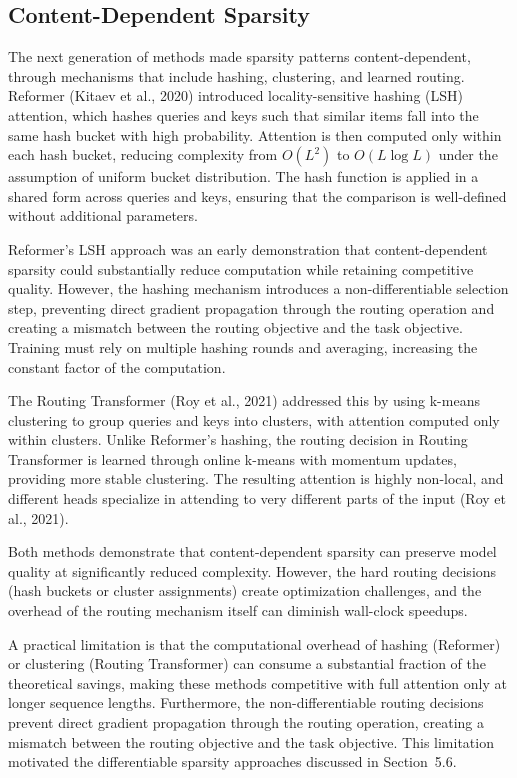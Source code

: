\documentclass[10pt,twocolumn]{article}
\begin{document}
\subsection{Content-Dependent Sparsity}\label{learnable-sparsity}

The next generation of methods made sparsity patterns content-dependent, through mechanisms that include hashing, clustering, and learned routing. Reformer (Kitaev et al., 2020) introduced locality-sensitive hashing (LSH) attention, which hashes queries and keys such that similar items fall into the same hash bucket with high probability. Attention is then computed only within each hash bucket, reducing complexity from $O(L^2)$ to $O(L \log L)$ under the assumption of uniform bucket distribution. The hash function is applied in a shared form across queries and keys, ensuring that the comparison is well-defined without additional parameters.

Reformer's LSH approach was an early demonstration that content-dependent sparsity could substantially reduce computation while retaining competitive quality. However, the hashing mechanism introduces a non-differentiable selection step, preventing direct gradient propagation through the routing operation and creating a mismatch between the routing objective and the task objective. Training must rely on multiple hashing rounds and averaging, increasing the constant factor of the computation.

The Routing Transformer (Roy et al., 2021) addressed this by using k-means clustering to group queries and keys into clusters, with attention computed only within clusters. Unlike Reformer's hashing, the routing decision in Routing Transformer is learned through online k-means with momentum updates, providing more stable clustering. The resulting attention is highly non-local, and different heads specialize in attending to very different parts of the input (Roy et al., 2021).

Both methods demonstrate that content-dependent sparsity can preserve model quality at significantly reduced complexity. However, the hard routing decisions (hash buckets or cluster assignments) create optimization challenges, and the overhead of the routing mechanism itself can diminish wall-clock speedups.

A practical limitation is that the computational overhead of hashing (Reformer) or clustering (Routing Transformer) can consume a substantial fraction of the theoretical savings, making these methods competitive with full attention only at longer sequence lengths. Furthermore, the non-differentiable routing decisions prevent direct gradient propagation through the routing operation, creating a mismatch between the routing objective and the task objective. This limitation motivated the differentiable sparsity approaches discussed in Section~5.6.
\end{document}

